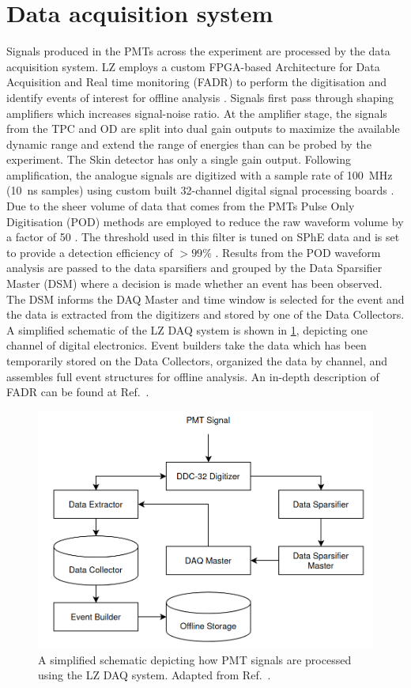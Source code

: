 \section{Data acquisition system}\label{sec:LZ/LZDAQ}
Signals produced in the PMTs across the experiment are processed by the data acquisition system. LZ employs a custom FPGA-based Architecture for Data Acquisition and Real time monitoring (FADR) to perform the digitisation and identify events of interest for offline analysis \cite{LZ:2024bvw,Druszkiewicz:2015pcl}. 
Signals first pass through shaping amplifiers which increases signal-noise ratio. At the amplifier stage, the signals from the TPC and OD are split into dual gain outputs to maximize the available dynamic range and extend the range of energies than can be probed by the experiment. The Skin detector has only a single gain output. Following amplification, the analogue signals are digitized with a sample rate of 100~MHz (10~ns samples) using custom built 32-channel digital signal processing boards \cite{Druszkiewicz:2015pcl}. Due to the sheer volume of data that comes from the PMTs Pulse Only Digitisation (POD) methods are employed to reduce the raw waveform volume by a factor of 50 \cite{LZTDR}. The threshold used in this filter is tuned on SPhE data and is set to provide a detection efficiency of $>99\%$ \cite{LZ:2024bvw}. Results from the POD waveform analysis are passed to the data sparsifiers and grouped by the Data Sparsifier Master (DSM) where a decision is made whether an event has been observed. The DSM informs the DAQ Master and time window is selected for the event and the data is extracted from the digitizers and stored by one of the Data Collectors. A simplified schematic of the LZ DAQ system is shown in \ref{fig:LZ/LZDAQ}, depicting one channel of digital electronics. Event builders take the data which has been temporarily stored on the Data Collectors, organized the data by channel, and assembles full event structures for offline analysis. An in-depth description of FADR can be found at Ref.~\cite{LZ:2024bvw}.
\begin{figure}[!ht]
    \centering
    \includegraphics[width=\linewidth]{figures/LZ/LZDAQ.png}
    \caption{A simplified schematic depicting how PMT signals are processed using the LZ DAQ system. Adapted from Ref.~\cite{LZ:2024bvw}.}
    \label{fig:LZ/LZDAQ}
\end{figure}
